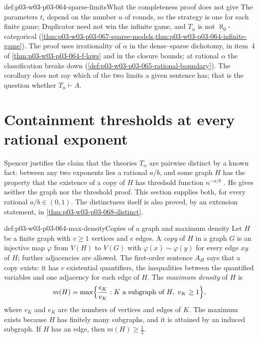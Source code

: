 \begin{hbwarning}{def:p03-w03-p03-064-sparse-limits}{What the completeness proof does not give}
The parameters \(t_i\) depend on the number \(u\) of rounds, so the strategy
is one for each finite game; Duplicator need not win the infinite game, and
\(T_\alpha\) is not \(\aleph_0\)-categorical
(\cref{thm:p03-w03-p03-067-sparse-models,thm:p03-w03-p03-064-infinite-game}).
The proof uses irrationality of \(\alpha\) in the dense--sparse dichotomy, in
item~4 of \cref{thm:p03-w03-p03-064-f-laws} and in the closure bounds; at
rational \(\alpha\) the classification breaks down
(\cref{def:p03-w03-p03-065-rational-boundary}).  The corollary does not say which of the two
limits a given sentence has; that is the question whether \(T_\alpha\vdash A\).
\end{hbwarning}

\section{Containment thresholds at every rational exponent}
\label{sec:p03-w03-p03-064-rational-thresholds}

Spencer justifies the claim that the theories \(T_\alpha\) are pairwise
distinct by a known fact: between any two exponents lies a rational \(a/b\),
and some graph \(H\) has the property that the existence of a copy of \(H\)
has threshold function \(n^{-a/b}\)
\cite[p.~15]{Spencer2007LogicRandomStructuresAuthor}.  He gives neither the
graph nor the threshold proof.  This section supplies both, for every
rational \(a/b\in(0,1)\).  The distinctness itself is also proved, by an
extension statement, in \cref{thm:p03-w03-p03-068-distinct}.

\begin{hbdefinition}{def:p03-w03-p03-064-max-density}{Copies of a graph and maximum density}
Let \(H\) be a finite graph with \(v\geq1\) vertices and \(e\) edges.  A
\emph{copy} of \(H\) in a graph \(G\) is an injective map \(\varphi\) from
\(V(H)\) to \(V(G)\) with \(\varphi(x)\sim\varphi(y)\) for every edge \(xy\)
of \(H\); further adjacencies are allowed.  The first-order sentence
\(A_H\) says that a copy exists: it has \(v\) existential quantifiers, the
inequalities between the quantified variables and one adjacency for each
edge of \(H\).  The \emph{maximum density} of \(H\) is
\[
  m(H)=\max\Bigl\{\frac{e_K}{v_K}:K\text{ a subgraph of }H,\ v_K\geq1\Bigr\},
\]
where \(v_K\) and \(e_K\) are the numbers of vertices and edges of \(K\).
The maximum exists because \(H\) has finitely many subgraphs, and it is
attained by an induced subgraph.  If \(H\) has an edge, then
\(m(H)\geq\frac12\).
\end{hbdefinition}

